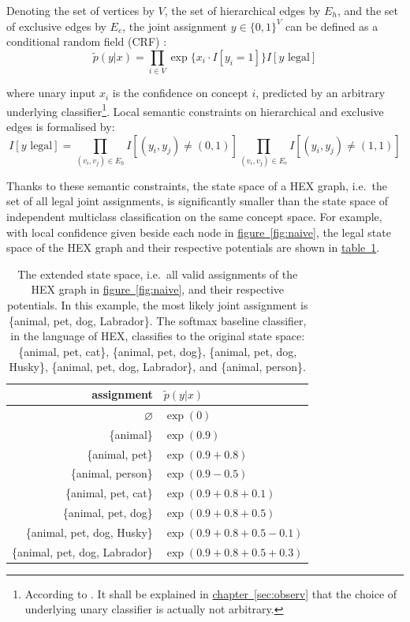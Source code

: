 \documentclass[11pt,a4paper]{book}
\begin{document}
Denoting the set of vertices by $V$, the set of hierarchical edges by $E_h$, and the set of exclusive edges by $E_e$, the joint assignment $y\in\{0,1\}^V$ can be defined as a conditional random field (CRF) \cite{lafferty2001conditional}:
\begin{equation}
\tilde{p}(y|x)=\prod_{i\in V}\exp\{x_i\cdot I[y_i=1]\}I[y\text{ legal}]
\label{eqn:naive}
\end{equation}

where unary input $x_i$ is the confidence on concept $i$, predicted by an arbitrary underlying classifier\footnote{According to \cite{deng2014large}. It shall be explained in \hyperref[sec:observ]{chapter~\ref{sec:observ}} that the choice of underlying unary classifier is actually not arbitrary.}. Local semantic constraints on hierarchical and exclusive edges is formalised by:
\begin{equation}
I[y\text{ legal}]=\prod_{(v_i,v_j)\in E_h}I[(y_i,y_j)\neq(0,1)]\prod_{(v_i,v_j)\in E_e}I[(y_i,y_j)\neq(1,1)]
\label{eqn:legal}
\end{equation}

Thanks to these semantic constraints, the state space of a HEX graph, i.e.\ the set of all legal joint assignments, is significantly smaller than the state space of independent multiclass classification on the same concept space. For example, with local confidence given beside each node in \hyperref[fig:naive]{figure~\ref{fig:naive}}, the legal state space of the HEX graph and their respective potentials are shown in \hyperref[tab:naive]{table~\ref{tab:naive}}.

\begin{table}[htbp]
\centering
\begin{tabular}{r|l}
assignment & $\tilde{p}(y|x)$\\
\hline
$\varnothing$ & $\exp(0)$\\
\{animal\} & $\exp(0.9)$\\
\{animal, pet\} & $\exp(0.9+0.8)$\\
\{animal, person\} & $\exp(0.9-0.5)$\\
\{animal, pet, cat\} & $\exp(0.9+0.8+0.1)$\\
\{animal, pet, dog\} & $\exp(0.9+0.8+0.5)$\\
\{animal, pet, dog, Husky\} & $\exp(0.9+0.8+0.5-0.1)$\\
\{animal, pet, dog, Labrador\} & $\exp(0.9+0.8+0.5+0.3)$
\end{tabular}
\caption{The extended state space, i.e.\ all valid assignments of the HEX graph in \hyperref[fig:naive]{figure~\ref{fig:naive}}, and their respective potentials. In this example, the most likely joint assignment is \{animal, pet, dog, Labrador\}. The softmax baseline classifier, in the language of HEX, classifies to the original state space: \{animal, pet, cat\}, \{animal, pet, dog\}, \{animal, pet, dog, Husky\}, \{animal, pet, dog, Labrador\}, and \{animal, person\}.}
\label{tab:naive}
\end{table}
\end{document}
